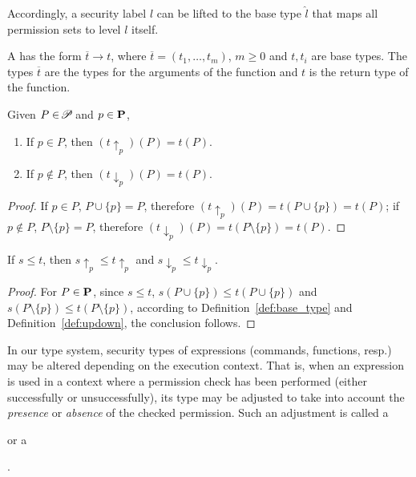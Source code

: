 {Accordingly, a security label $l$ can be lifted to the base type $\hat{l}$ that maps all permission sets to level $l$ itself.



 \begin{definition}\label{def:fun-type}
   A  has the form $\overline{t} \rightarrow t$, where $\overline{t}=(t_1,\ldots,t_m)$, $m\geq 0$ and $t, t_i$ are base types.
   The types $\overline t$ are the types for the arguments of the function and $t$ is the return type of the function.
 \end{definition}

\begin{lemma}\label{lem:promote-demote}
Given $P\in\!\mathscr{P}\!$ and $p\in\mathbf{P}$,
\begin{enumerate}[label*={(\alph*)}]
  \item\label{lem:promote-demote-1} If $p \in P$, then $(t\uparrow_{p})(P) = t(P)$.
	\item\label{lem:promote-demote-2} If $p \notin P$, then $(t\downarrow_{p})(P) = t(P)$.
\end{enumerate}
\end{lemma}
 \begin{proof}
If $p\in P$, $P\cup\{p\}=P$, therefore $(t\uparrow_{p}) (P) = t(P\cup \{p\})=t(P)$; if $p\notin P$, $P\setminus\{p\}=P$, therefore $(t\downarrow_{p}) (P) = t(P\setminus\{p\})=t(P)$.
 \end{proof}

\begin{lemma}\label{lem:pd-order}
If $s\leq t$, then $s\uparrow_{p} \leq t\uparrow_{p}$ and $s\downarrow_{p} \leq t\downarrow_{p}$.
\end{lemma}
 \begin{proof}
For $P\in\mathbf{P}$, since $s\leq t$, $s(P\cup\{p\})\leq t(P\cup\{p\})$ and $s(P\setminus\{p\})\leq t(P\setminus\{p\})$, according to Definition~\ref{def:base_type} and Definition~\ref{def:updown}, the conclusion follows.
 \end{proof}


In our type system, security types of  expressions (commands, functions, resp.) may be
altered depending on the execution context. That is, when an expression is used in
a context where a permission check has been performed (either successfully or unsuccessfully),
its type may be adjusted to take into account the \emph{presence} or \emph{absence}
of the checked permission.
Such an adjustment is called a { or a {.


}}}
